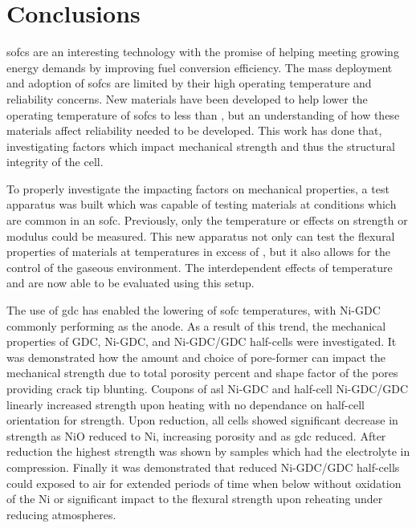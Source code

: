 


\chapter{Conclusions}

\Glspl{sofc} are an interesting technology with the promise of helping meeting growing energy demands by improving fuel conversion efficiency.
The mass deployment and adoption of \glspl{sofc} are limited by their high operating temperature and reliability concerns.
New materials have been developed to help lower the operating temperature of \glspl{sofc} to less than , but an understanding of how these materials affect reliability needed to be developed.
This work has done that, investigating factors which impact mechanical strength and thus the structural integrity of the cell.

To properly investigate the impacting factors on mechanical properties, a test apparatus was built which was capable of testing materials at conditions which are common in an \gls{sofc}.
Previously, only the temperature or  effects on strength or modulus could be measured.
This new apparatus not only can test the flexural properties of materials at temperatures in excess of , but it also allows for the control of the gaseous environment.
The interdependent effects of temperature and  are now able to be evaluated using this setup.

The use of \gls{gdc} has enabled the lowering of \gls{sofc} temperatures, with Ni-GDC commonly performing as the anode.
As a result of this trend, the mechanical properties of GDC, Ni-GDC, and Ni-GDC/GDC half-cells were investigated.
It was demonstrated how the amount and choice of pore-former can impact the mechanical strength due to total porosity percent and shape factor of the pores providing crack tip blunting.
Coupons of \gls{asl} Ni-GDC and half-cell Ni-GDC/GDC linearly increased strength upon heating with no dependance on half-cell orientation for strength.
Upon reduction, all cells showed significant decrease in strength as NiO reduced to Ni, increasing porosity and as \gls{gdc} reduced.
After reduction the highest strength was shown by samples which had the electrolyte in compression.
Finally it was demonstrated that reduced Ni-GDC/GDC half-cells could exposed to air for extended periods of time when below  without oxidation of the Ni or significant impact to the flexural strength upon reheating under reducing atmospheres.

